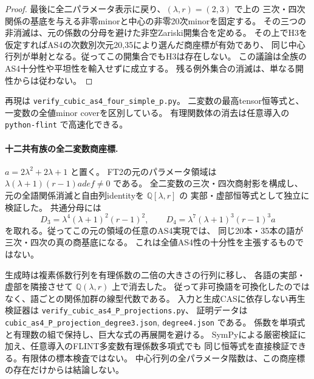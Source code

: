 \begin{proof}
最後に全二パラメータ表示に戻り、$(\lambda,r)=(2,3)$ で上の
三次・四次関係の基底を与える非零minorと中心の非零20次minorを固定する。
その三つの非消滅は、元の係数の分母を避けた非空Zariski開集合を定める。
その上でH3を仮定すればAS4の次数別次元20,35により選んだ商座標が有効であり、
同じ中心行列が単射となる。従ってこの開集合でもH3は存在しない。
この議論は全族のAS4十分性や平坦性を輸入せずに成立する。
残る例外集合の消滅は、単なる開性からは従わない。
\end{proof}

再現は \texttt{verify\_cubic\_as4\_four\_simple\_p.py}。
二変数の最高tensor恒等式と、一変数の全値minor coverを区別している。
有理関数体の消去は任意導入の \texttt{python-flint} で高速化できる。

\paragraph{十二共有族の全二変数商座標.}
$a=2\lambda^2+2\lambda+1$ と置く。
FT2の元のパラメータ領域は
$\lambda(\lambda+1)(r-1)adef\ne0$ である。
全二変数の三次・四次商射影を構成し、
元の全語関係消滅と自由列identityを $\mathbb Q[\lambda,r]$ の
実部・虚部恒等式として独立に検証した。
共通分母には
\[
 D_3=\lambda^4(\lambda+1)^2(r-1)^2,\qquad
 D_4=\lambda^7(\lambda+1)^3(r-1)^3a
\]
を取れる。従ってこの元の領域の任意のAS4実現では、
同じ20本・35本の語が三次・四次の真の商基底になる。
これは全値AS4性の十分性を主張するものではない。

生成時は複素係数行列を有理係数の二倍の大きさの行列に移し、
各語の実部・虚部を隣接させて $\mathbb Q(\lambda,r)$ 上で消去した。
従って非可換語を可換化したのではなく、語ごとの関係加群の線型代数である。
入力と生成CASに依存しない再生検証器は
\texttt{verify\_\allowbreak{}cubic\_\allowbreak{}as4\_\allowbreak{}P\_\allowbreak{}projections.py}、
証明データは
\texttt{cubic\_\allowbreak{}as4\_\allowbreak{}P\_\allowbreak{}projection\_\allowbreak{}degree3.json},
\texttt{degree4.json} である。
係数を単項式と有理数の組で保持し、巨大な式の再展開を避ける。
SymPyによる厳密検証に加え、任意導入のFLINT多変数有理係数多項式でも
同じ恒等式を直接検証できる。有限体の標本検査ではない。
中心行列の全パラメータ階数は、この商座標の存在だけからは結論しない。

